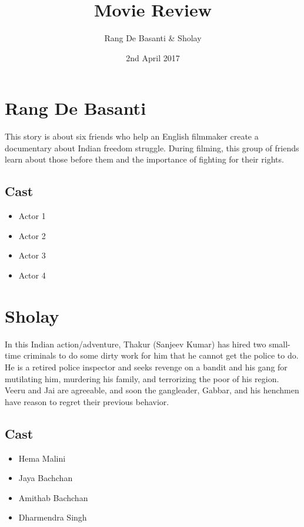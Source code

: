 \documentclass{article}
\title{Movie Review}
\author{Rang De Basanti \& Sholay }
\date{2nd April 2017}
\begin{document}
\maketitle

\section{Rang De Basanti}
This story is about six friends who help an English filmmaker create a documentary about Indian freedom struggle. During filming, this group of friends learn about those before them and the importance of fighting for their rights. 
\subsection{Cast}
\begin{itemize}
  \item Actor 1
  \item Actor 2
  \item Actor 3
  \item Actor 4
\end{itemize}
\section{Sholay}
In this Indian action/adventure, Thakur (Sanjeev Kumar) has hired two small-time criminals to do some dirty work for him that he cannot get the police to do. He is a retired police inspector and seeks revenge on a bandit and his gang for mutilating him, murdering his family, and terrorizing the poor of his region. Veeru and Jai are agreeable, and soon the gangleader, Gabbar, and his henchmen have reason to regret their previous behavior.
\subsection{Cast}
\begin{itemize}
\item Hema Malini
\item Jaya Bachchan
\item Amithab Bachchan
\item Dharmendra Singh
  \end{itemize}
\end{document}
